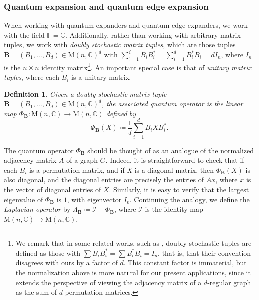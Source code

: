 \documentclass[11pt]{article}
\newtheorem{definition}[theorem]{Definition}
\theoremstyle{plain}
\numberwithin{equation}{section}
\theoremstyle{definition}
\newcommand{\F}{\mathbb{F}}
\newcommand{\bC}{\mathbb{C}}
\newcommand{\M}{\mathrm{M}}
\newcommand{\tuple}[1]{\mathbf{#1}}
\newcommand{\vB}{\tuple{B}}
\begin{document}
\subsubsection{Quantum expansion and quantum edge expansion}
When working with quantum expanders and quantum edge expanders, we work with the field $\F=\bC$. Additionally, rather than working with arbitrary matrix tuples, we work with \emph{doubly stochastic matrix tuples}, which are those tuples $\vB=(B_1,\dots,B_d) \in \M(n,\bC)^d$ with $\sum_{i=1}^d B_i B_i^* = \sum_{i=1}^d B_i^* B_i=dI_n$, where $I_n$ is the $n\times n$ identity matrix\footnote{We remark that in some related works, such as \cite{GGOW16,Gur04}, doubly stochastic tuples are defined as those with $\sum B_i B_i^*=\sum B_i^* B_i=I_n$, that is, that their convention disagrees with ours by a factor of $d$. This constant factor is immaterial, but the normalization above is more natural for our present applications, since it extends the perspective of viewing the adjacency matrix of a $d$-regular graph as the sum of $d$ permutation matrices.}. An important special case is that of \emph{unitary matrix tuples}, where each $B_i$ is a unitary matrix.

\begin{definition}
    Given a doubly stochastic matrix tuple $\vB=(B_1,\dots,B_d) \in \M(n,\bC)^d$, the \emph{associated quantum operator} is the linear map $\Phi_\vB:\M(n,\bC) \to \M(n,\bC)$ defined by
    \[
        \Phi_\vB (X) \coloneqq \frac 1d \sum_{i=1}^d B_i X B_i^*.
    \]
\end{definition}
The quantum operator $\Phi_\vB$ should be thought of as an analogue of the normalized adjacency matrix $A$ of a graph $G$. Indeed, it is straightforward to check that if each $B_i$ is a permutation matrix, and if $X$ is a diagonal matrix, then $\Phi_\vB(X)$ is also diagonal, and the diagonal entries are precisely the entries of $Ax$, where $x$ is the vector of diagonal entries of $X$. Similarly, it is easy to verify that the largest eigenvalue of $\Phi_\vB$ is $1$, with eigenvector $I_n$. Continuing the analogy, we  define the \emph{Laplacian operator} by $\Lambda_\vB \coloneqq \mathcal{I}- \Phi_\vB$, where $\mathcal{I}$ is the identity map $\M(n,\bC) \to \M(n,\bC)$.
\end{document}
